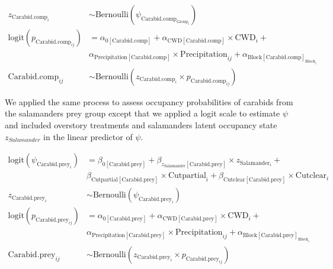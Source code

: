\begin{align}
  z_{\text{Carabid.comp}_i} &\sim 
  \text{Bernoulli}(\psi_{\text{Carabid.comp}_{\text{Group}_i}}) \nonumber \\
  \text{logit}(p_{\text{Carabid.comp}_{ij}}) &= 
  \alpha_{0[\text{Carabid.comp}]} + \alpha_{\text{CWD}[\text{Carabid.comp}]} \times \text{CWD}_i + \\
  &\alpha_{\text{Precipitation}[\text{Carabid.comp}]} \times \text{Precipitation}_{ij} + \alpha_{\text{Block}[\text{Carabid.comp}]_{\text{Block}_i}} \nonumber \\
  \text{Carabid.comp}_{ij} &\sim 
  \text{Bernoulli}(z_{\text{Carabid.comp}_i} \times p_{\text{Carabid.comp}_{ij}}) \nonumber
  \end{align}

\vspace{0.5cm}
  
We applied the same process to assess occupancy probabilities of carabids from the salamanders prey group except that we applied a logit scale to estimate $\psi$ 
and included overstory treatments and salamanders latent occupancy state $z_{Salamander}$ in the linear predictor of $\psi$.

\vspace{0.5cm}

\begin{align}
  \text{logit}(\psi_{\text{Carabid.prey}_i}) &= 
  \beta_{0[\text{Carabid.prey}]} + \beta_{z_{\text{Salamander}}[\text{Carabid.prey}]} \times z_{\text{Salamander}_i} + \nonumber \\
  &\beta_{\text{Cutpartial}[\text{Carabid.prey}]} \times \text{Cutpartial}_i + \beta_{\text{Cutclear}[\text{Carabid.prey}]} \times \text{Cutclear}_i \nonumber\\
  z_{\text{Carabid.prey}_i} &\sim 
  \text{Bernoulli}(\psi_{\text{Carabid.prey}_i}) \nonumber \\
  \text{logit}(p_{\text{Carabid.prey}_{ij}}) &= 
  \alpha_{0[\text{Carabid.prey}]} + \alpha_{\text{CWD}[\text{Carabid.prey}]} \times \text{CWD}_i +  \\
  &\alpha_{\text{Precipitation}[\text{Carabid.prey}]} \times \text{Precipitation}_{ij} + \alpha_{\text{Block}[\text{Carabid.prey}]_{\text{Block}_i}} \nonumber \\
  \text{Carabid.prey}_{ij} &\sim 
  \text{Bernoulli}(z_{\text{Carabid.prey}_i} \times p_{\text{Carabid.prey}_{ij}}) \nonumber
\end{align}

\vspace{0.5cm}


